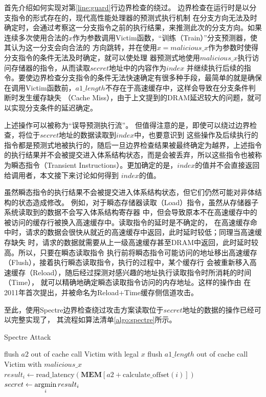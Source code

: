 首先介绍如何实现对第\ref{line:guard}行边界检查的绕过。
边界检查在运行时是以分支指令的形式存在的，现代高性能处理器的预测式执行机制
在分支方向无法及时确定时，会通过考察这一分支指令之前的执行结果，来推测此次的分支方向。如果
连续多次使用合法的$x$作为参数调用Victim函数，“训练（Train）”分支预测器，使其认为这一分支会向合法的
方向跳转，并在使用$x=malicious\_x$作为参数时使得分支指令的条件无法及时确定，就可以使处理
器预测式地使用$malicious\_x$执行访问存储器的指令，从而读取$secret$地址中的内容作为$index$
并继续执行后续的指令。要使边界检查分支指令的条件无法快速确定有很多种手段，最简单的就是确保
在调用Victim函数前，$a1\_length$不存在于高速缓存中，这样会导致在分支条件判断时发生缓存缺失
（Cache Miss），由于上文提到的DRAM延迟较大的问题，就可以实现分支条件的延迟确定。

上述操作可以被称为“误导预测执行流”。
但值得注意的是，即使可以绕过边界检查，将位于$secret$地址的数据读取到$index$中，也要意识到
这些操作及后续执行的指令都是预测式地被执行的，随后一旦边界检查结果被最终确定为越界，上述指令
的执行结果并不会被提交进入体系结构状态，而是会被丢弃，所以这些指令也被称为瞬态指令（Transient
Instructions）。更加确定的是，$index$的值并不会直接返回给调用者，本文接下来讨论如何得到
$index$的值。

虽然瞬态指令的执行结果不会被提交进入体系结构状态，但它们仍然可能对非体结构的状态造成修改。
例如，对于瞬态存储器读取（Load）指令，虽然从存储器子系统读取到的数据不会写入体系结构寄存器
中，但会导致原本不在高速缓存中的被访问的缓存行被换入高速缓存中。读取指令的延时是不确定的，
在高速缓存命中时，请求的数据会很快从就近的高速缓存中返回，此时延时较低；同理当高速缓存缺失
时，请求的数据就需要从上一级高速缓存甚至DRAM中返回，此时延时较高。所以，只要在瞬态读取指令
执行前将瞬态指令可能访问的地址移出高速缓存（Flush），接着执行瞬态读取指令，执行的过程中，某个缓存行
会被重新移入高速缓存（Reload），随后经过探测对感兴趣的地址执行读取指令时所消耗的时间（Time），
就可以精确地确定瞬态读取指令访问的内存地址。这样的操作由\citet{gullasch2011cache}
在2011年首次提出，并被命名为Reload+Time缓存侧信道攻击。

至此，使用Spectre边界检查绕过攻击方案读取位于$secret$地址的数据的操作已经可以完整实现了，
其流程如算法清单\ref{algo:spectre}所示。

\begin{algorithm}
	\caption{Spectre Attack}\label{algo:spectre}
	\begin{algorithmic}[1]
			\State flush $a2$ out of cache \label{line:flush-a2}
			\Repeat \label{line:train-begin}
				\State call Victim with legal $x$
			 \label{line:train-end}
			\State flush $a1\_length$ out of cache \label{line:flush-a1l}
			\State call Victim with $malicious\_x$ \label{line:call-victim}
			 \label{line:time-begin}
				\State $result_{i} \gets \text{read\_latency}(\textbf{MEM}[a2 + \text{calculate\_offset}(i)])$
		  	\EndFor \label{line:time-end}
			\State $secret \gets \operatorname*{argmin}\limits_{i} result_{i}$ \label{line:find-secret}
		\EndFunction
	\end{algorithmic}
\end{algorithm}

